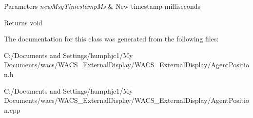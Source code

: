 \begin{DoxyParams}{Parameters}
{\em newMsgTimestampMs} & New timestamp milliseconds \\
\hline
\end{DoxyParams}
\begin{DoxyReturn}{Returns}
void 
\end{DoxyReturn}


The documentation for this class was generated from the following files:\begin{DoxyCompactItemize}
\item 
C:/Documents and Settings/humphjc1/My Documents/wacs/WACS\_\-ExternalDisplay/WACS\_\-ExternalDisplay/AgentPosition.h\item 
C:/Documents and Settings/humphjc1/My Documents/wacs/WACS\_\-ExternalDisplay/WACS\_\-ExternalDisplay/AgentPosition.cpp\end{DoxyCompactItemize}
